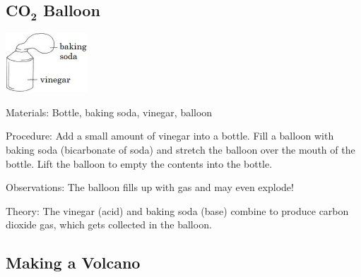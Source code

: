 \begin{multicols}{2}
\subsection{\textbf{CO}$_\textbf{2}$ Balloon} 

\begin{center}
\includegraphics[width=0.23\textwidth]{./img/vso/co2-balloon.jpg}
\end{center}

\begin{description*}
\item[Materials:]{Bottle, baking soda, vinegar, balloon}
\item[Procedure:]{Add a small amount of vinegar into a bottle. Fill a balloon with baking soda (bicarbonate of soda) and stretch the balloon over the mouth of the bottle. Lift the balloon to empty the contents into the bottle.}
\item[Observations:]{The balloon fills up with gas and may even explode!}
\item[Theory:]{The vinegar (acid) and baking soda (base) combine to produce carbon dioxide gas, which gets collected in the balloon.}
\end{description*}

\subsection{Making a Volcano}  %



\end{multicols}
